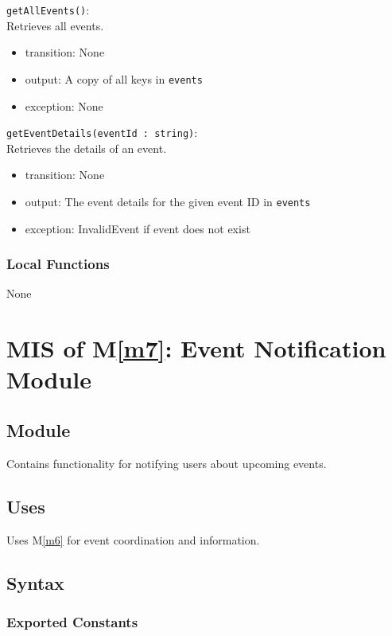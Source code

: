 \documentclass[12pt, titlepage]{article}
\begin{document}
\noindent \texttt{getAllEvents()}:\\
Retrieves all events.
\begin{itemize}
\item transition: None
\item output: A copy of all keys in \texttt{events}
\item exception: None
\end{itemize}

\noindent \texttt{getEventDetails(eventId : string)}:\\
Retrieves the details of an event.
\begin{itemize}
\item transition: None
\item output: The event details for the given event ID in \texttt{events}
\item exception: InvalidEvent if event does not exist
\end{itemize}

\subsubsection{Local Functions}

None

\newpage

\section{MIS of M\ref{m7}: Event Notification Module}

\subsection{Module}

Contains functionality for notifying users about upcoming events.

\subsection{Uses}

Uses M\ref{m6} for event coordination and information.

\subsection{Syntax}

\subsubsection{Exported Constants}
\end{document}
